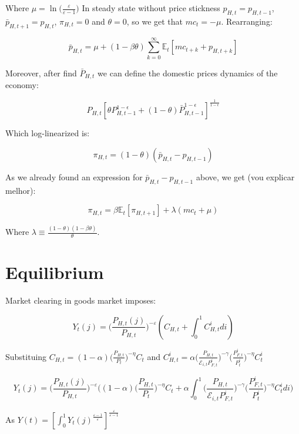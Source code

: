\documentclass{article}
\newcommand{\Et}{\mathbb{E}_t}
\begin{document}
Where $\mu = \ln\big(\frac{\varepsilon}{\varepsilon-1}\big)$ In steady state without price stickness $p_{H,t} = p_{H,t-1}$, $\bar p_{H,t+1} = p_{H, t}$, $\pi_{H, t} = 0$ and $\theta =0$, so we get that $mc_t = -\mu$. Rearranging:

$$\bar p_{H,t} = \mu + (1- \beta \theta) \sum^\infty_{k=0} \Et[mc_{t+k} + p_{H, t+k}]$$

Moreover, after find $\bar P_{H,t}$ we can define the domestic prices dynamics of the economy:

$$P_{H,t} [\theta P_{H, t-1}^{1-\epsilon} + (1-\theta) \bar P_{H, t-1}^{1-\epsilon}]^\frac{1}{1- \epsilon}$$

Which log-linearized is:

$$\pi_{H, t} = (1-\theta)(\bar p_{H,t} - p_{H,t-1})$$

As we already found an expression for $\bar p_{H,t} - p_{H,t-1}$ above, we get (vou explicar melhor):

$$\pi_{H, t} = \beta \Et[\pi_{H, t+1}] + \lambda (mc_t + \mu)$$

Where $\lambda \equiv \frac{(1-\theta)(1 - \beta \theta)}{\theta}$.

\section{Equilibrium}

Market clearing in goods market imposes:

$$Y_{t}(j) = \bigg( \frac{P_{H,t}(j)}{P_{H,t}} \bigg)^{-\varepsilon} (C_{H,t} +  \int_0^1 C^i_{H, t} di)$$

Substituing $C_{H,t} = (1-\alpha) \Big( \frac{P_{H,t}}{P_t} \Big)^{-\eta} C_t$ and $C^i_{H,t} = \alpha \Big( \frac{P_{H,t}}{\mathcal{E}_{i,t} P^i_{F,t}} \Big)^{-\gamma} \Big( \frac{P^i_{F,t}}{P^i_{t}} \Big)^{-\eta} C^i_t$

$$Y_{t}(j) = \bigg( \frac{P_{H,t}(j)}{P_{H,t}} \bigg)^{-\varepsilon} \bigg((1-\alpha) \Big( \frac{P_{H,t}}{P_t} \Big)^{-\eta} C_t +  \alpha \int_0^1 \Big( \frac{P_{H,t}}{\mathcal{E}_{i,t} P^i_{F,t}} \Big)^{-\gamma} \Big( \frac{P^i_{F,t}}{P^i_{t}} \Big)^{-\eta} C^i_t di \bigg)$$

As $Y(t) = [\int^1_0 Y_t(j)^{\frac{\varepsilon-1}{\varepsilon}}]^\frac{\varepsilon}{\varepsilon-1}$
\end{document}
